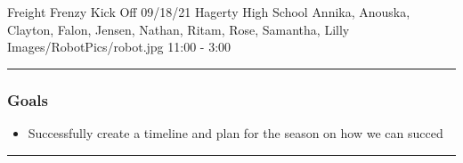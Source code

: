 \insertmeeting 
	{Freight Frenzy Kick Off} 
	{09/18/21}
	{Hagerty High School}
	{Annika, Anouska, Clayton, Falon, Jensen, Nathan, Ritam, Rose, Samantha, Lilly}
	{Images/RobotPics/robot.jpg}
	{11:00 - 3:00}
	
\noindent\hfil\rule{\textwidth}{.4pt}\hfil
\subsubsection*{Goals}
\begin{itemize}
    \item Successfully create a timeline and plan for the season on how we can succed 

\end{itemize} 

\noindent\hfil\rule{\textwidth}{.4pt}\hfil

